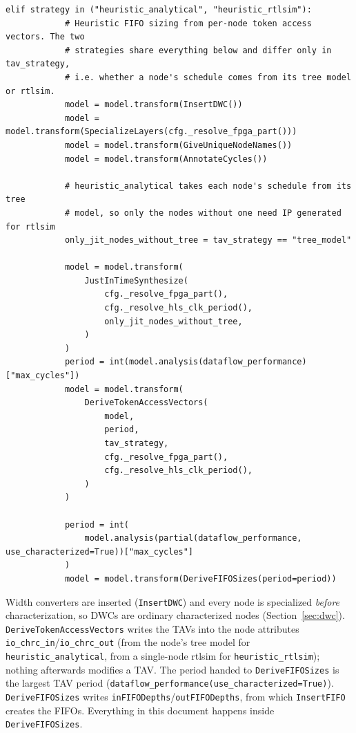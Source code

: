 \documentclass[10pt,a4paper]{article}
\newcommand{\code}[1]{\texttt{#1}}
\begin{document}
\begin{lstlisting}[firstnumber=1097,title={\texttt{src/finn/builder/build\_dataflow\_steps.py}, lines 1097--1131}]
        elif strategy in ("heuristic_analytical", "heuristic_rtlsim"):
            # Heuristic FIFO sizing from per-node token access vectors. The two
            # strategies share everything below and differ only in tav_strategy,
            # i.e. whether a node's schedule comes from its tree model or rtlsim.
            model = model.transform(InsertDWC())
            model = model.transform(SpecializeLayers(cfg._resolve_fpga_part()))
            model = model.transform(GiveUniqueNodeNames())
            model = model.transform(AnnotateCycles())

            # heuristic_analytical takes each node's schedule from its tree
            # model, so only the nodes without one need IP generated for rtlsim
            only_jit_nodes_without_tree = tav_strategy == "tree_model"

            model = model.transform(
                JustInTimeSynthesize(
                    cfg._resolve_fpga_part(),
                    cfg._resolve_hls_clk_period(),
                    only_jit_nodes_without_tree,
                )
            )
            period = int(model.analysis(dataflow_performance)["max_cycles"])
            model = model.transform(
                DeriveTokenAccessVectors(
                    model,
                    period,
                    tav_strategy,
                    cfg._resolve_fpga_part(),
                    cfg._resolve_hls_clk_period(),
                )
            )

            period = int(
                model.analysis(partial(dataflow_performance, use_characterized=True))["max_cycles"]
            )
            model = model.transform(DeriveFIFOSizes(period=period))
\end{lstlisting}

Width converters are inserted (\code{InsertDWC}) and every node is specialized
\emph{before} characterization, so DWCs are ordinary characterized nodes
(Section~\ref{sec:dwc}). \code{DeriveTokenAccessVectors} writes the TAVs into the
node attributes \code{io\_chrc\_in}/\code{io\_chrc\_out} (from the node's tree
model for \code{heuristic\_analytical}, from a single-node rtlsim for
\code{heuristic\_rtlsim}); nothing afterwards modifies a TAV. The period handed to
\code{DeriveFIFOSizes} is the largest TAV period
(\code{dataflow\_performance(use\_characterized=True)}). \code{DeriveFIFOSizes}
writes \code{inFIFODepths}/\code{outFIFODepths}, from which \code{InsertFIFO}
creates the FIFOs. Everything in this document happens inside
\code{DeriveFIFOSizes}.
\end{document}
